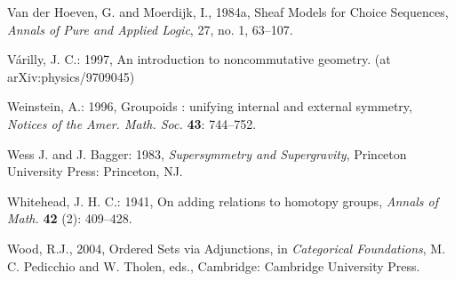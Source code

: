 \documentclass[12pt]{article}
\theoremstyle{plain}
\theoremstyle{definition}
\numberwithin{equation}{section}
\begin{document}
\begin{thebibliography}{199}
Van der Hoeven, G. and  Moerdijk, I., 1984a, Sheaf Models for Choice Sequences, 
{\em Annals of Pure and Applied Logic}, 27, no. 1, 63--107. 

V\'arilly, J. C.: 1997, An introduction to noncommutative geometry. (at arXiv:physics/9709045)

Weinstein, A.: 1996, Groupoids : unifying internal and external symmetry, \emph{Notices of the Amer. Math. Soc.} \textbf{43}: 744--752.

Wess J. and J. Bagger: 1983, \emph{Supersymmetry and Supergravity}, Princeton University Press: Princeton, NJ.

Whitehead, J. H. C.: 1941, On adding relations to homotopy groups, \emph{Annals of Math.} \textbf{42} (2): 409--428.

Wood, R.J., 2004, Ordered Sets via Adjunctions, in {\em Categorical Foundations}, M. C. Pedicchio and W. Tholen, eds., Cambridge: Cambridge University Press. 

\end{thebibliography}
\end{document}
